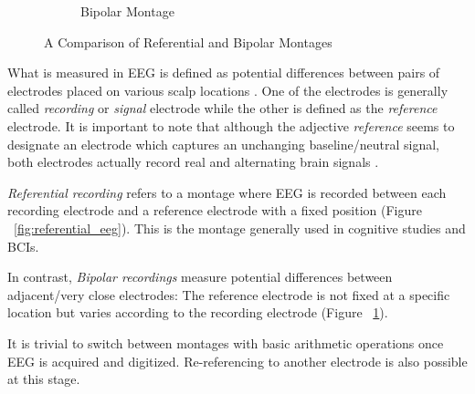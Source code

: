 \documentclass[12pt]{article}
\numberwithin{equation}{section}
\numberwithin{figure}{section}
\numberwithin{table}{section}
\begin{document}
\begin{figure}
\begin{subfigure}{.5\textwidth}
        \caption{Bipolar Montage}
        \label{fig:bipolar_eeg}
    \end{subfigure}
    \caption{A Comparison of Referential and Bipolar Montages}
    \label{fig:ref_bipolar_eeg}
\end{figure}


\par{
    What is measured in EEG is defined as potential differences between pairs
    of electrodes placed on various scalp locations \citep{nunez_electric_2006}.
    One of the electrodes is generally called \emph{recording} or \emph{signal}
    electrode while the other is defined as the \emph{reference} electrode. It is
    important to note that although the adjective \emph{reference} seems to
    designate an electrode which captures an unchanging baseline/neutral signal,
    both electrodes actually record real and alternating brain signals \citep{wolpaw_brain-computer_2012}.
}
\par{
    \emph{Referential recording} refers to a montage where EEG is recorded
    between each recording electrode and a reference electrode with a fixed position (Figure ~\ref{fig:referential_eeg}).
    This is the montage generally used in cognitive studies and BCIs.
}
\par{
    In contrast, \emph{Bipolar recordings} measure potential differences between
    adjacent/very close electrodes: The reference electrode is not fixed at a
    specific location but varies according to the recording electrode (Figure ~\ref{fig:bipolar_eeg}).
}
\par{
    It is trivial to switch between montages with basic arithmetic operations once EEG is acquired and digitized.
    Re-referencing to another electrode is also possible at this stage.
}
\end{document}
